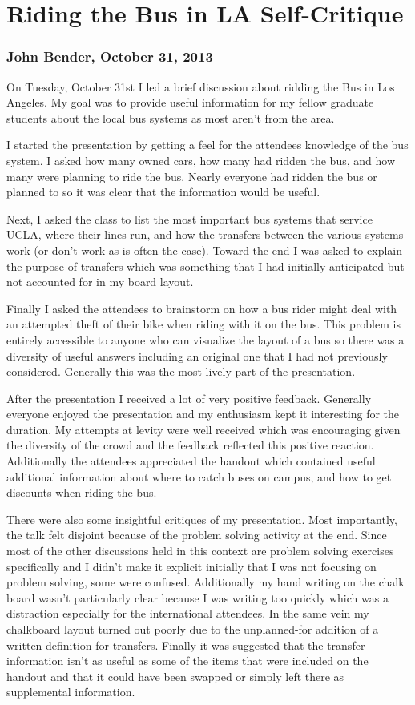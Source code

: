\documentclass[pdftex,12pt,a4paper]{report}
\begin{document}
\section{Riding the Bus in LA Self-Critique}
\subsubsection{John Bender, October 31, 2013}

On Tuesday, October 31st I led a brief discussion about ridding the Bus in Los Angeles. My goal was to provide useful information for my fellow graduate students about the local bus systems as most aren't from the area.

I started the presentation by getting a feel for the attendees knowledge of the bus system. I asked how many owned cars, how many had ridden the bus, and how many were planning to ride the bus. Nearly everyone had ridden the bus or planned to so it was clear that the information would be useful.

Next, I asked the class to list the most important bus systems that service UCLA, where their lines run, and how the transfers between the various systems work (or don't work as is often the case). Toward the end I was asked to explain the purpose of transfers which was something that I had initially anticipated but not accounted for in my board layout.

Finally I asked the attendees to brainstorm on how a bus rider might deal with an attempted theft of their bike when riding with it on the bus. This problem is entirely accessible to anyone who can visualize the layout of a bus so there was a diversity of useful answers including an original one that I had not previously considered. Generally this was the most lively part of the presentation.

After the presentation I received a lot of very positive feedback. Generally everyone enjoyed the presentation and my enthusiasm kept it interesting for the duration. My attempts at levity were well received which was encouraging given the diversity of the crowd and the feedback reflected this positive reaction. Additionally the attendees appreciated the handout which contained useful additional information about where to catch buses on campus, and how to get discounts when riding the bus.

There were also some insightful critiques of my presentation. Most importantly, the talk felt disjoint because of the problem solving activity at the end. Since most of the other discussions held in this context are problem solving exercises specifically and I didn't make it explicit initially that I was not focusing on problem solving, some were confused. Additionally my hand writing on the chalk board wasn't particularly clear because I was writing too quickly which was a distraction especially for the international attendees. In the same vein my chalkboard layout turned out poorly due to the unplanned-for addition of a written definition for transfers. Finally it was suggested that the transfer information isn't as useful as some of the items that were included on the handout and that it could have been swapped or simply left there as supplemental information.
\end{document}

